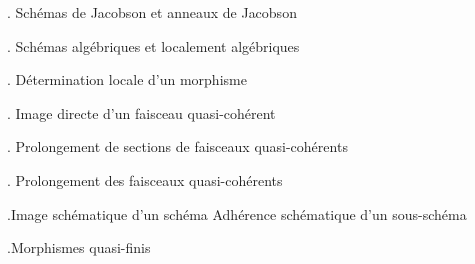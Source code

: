 \noindent{}. Schémas de Jacobson et anneaux de Jacobson\dotfill

\noindent{}. Schémas algébriques et localement algébriques\dotfill

\noindent{}. Détermination locale d'un morphisme\dotfill

\noindent{}. Image directe d'un faisceau quasi-cohérent\dotfill

\noindent{}. Prolongement de sections de faisceaux quasi-cohérents

\noindent{}. Prolongement des faisceaux quasi-cohérents\dotfill

\noindent{}.Image schématique d'un schéma Adhérence schématique d'un sous-schéma\dotfill

\noindent{}.Morphismes quasi-finis\dotfill

\clearpage
